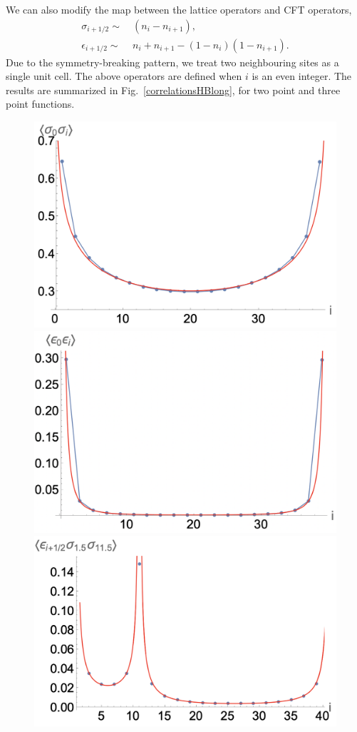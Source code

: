 \documentclass[prb,twocolumn,11pt]{revtex4-1}
\begin{document}
We can also modify the map between the lattice operators and CFT operators,
\begin{align}
    \sigma_{i+1/2}\sim &~(n_i-n_{i+1}),\nonumber\\
    \epsilon_{i+1/2} \sim &~n_i+n_{i+1}- (1-n_{i})(1-n_{i+1}).
\end{align}
Due to the symmetry-breaking pattern, we treat two neighbouring sites as a single unit cell. The above operators are defined when $i$ is an even integer.
The results are summarized in Fig.~\ref{correlationsHBlong}, for two point and three point functions.
\begin{figure}[htbp]
\centering
\includegraphics[scale=0.35]{ss_long_range.png}
\includegraphics[scale=0.35]{ee_long_range.png}
\includegraphics[scale=0.35]{ess_long_range.png}

\end{figure}
\end{document}
